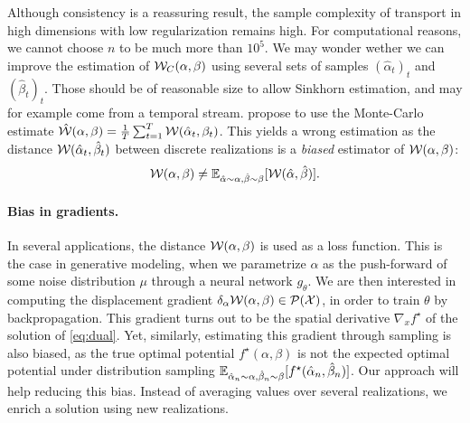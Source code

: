 Although consistency is a reassuring result, the sample complexity of transport
in high dimensions with low regularization remains high. For computational
reasons, we cannot choose $n$ to be much more than $10^5$. We may wonder wether
we can improve the estimation of $\mathcal{W}_{C}(\alpha,\beta)$ using several sets of
samples $(\hat \alpha_t)_t$ and ${(\hat \beta_t)}_t$. Those should be of
reasonable size to allow Sinkhorn estimation, and may for example come from a
temporal stream. \citet{2018-Genevay-aistats} propose to use the Monte-Carlo
estimate $\hat {\mathcal{W}}(\alpha, \beta) = \frac{1}{T} \sum_{t=1}^T \mathcal{W}(\hat \alpha_t,
\beta_t)$. This yields a wrong estimation as the distance $\mathcal{W}(\hat
\alpha_t, \hat \beta_t)$ between discrete realizations is a \textit{biased}
estimator of $\mathcal{W}(\alpha, \beta)$:
\begin{equation}
    \mathcal{W}(\alpha, \beta) \neq 
    \mathbb{E}_{\hat \alpha \sim \alpha, \hat \beta \sim \beta} [\mathcal{W}(\hat \alpha, \hat \beta)].
\end{equation}

\paragraph{Bias in gradients.} In several applications, the distance
$\mathcal{W}(\alpha, \beta)$ is used as a loss function. This is the case in generative
modeling, when we parametrize $\alpha$ as the push-forward of some noise
distribution $\mu$ through a neural network $g_\theta$. We are then interested
in computing the displacement gradient $\delta_\alpha \mathcal{W}(\alpha, \beta) \in
\mathcal{P}(\mathcal{X})$, in order to train $\theta$ by backpropagation. This gradient turns
out to be the spatial derivative $\nabla_x f^\star$ of the solution of
\eqref{eq:dual}. Yet, similarly, estimating this gradient through sampling is
also biased, as the true optimal potential $f^\star(\alpha, \beta)$ is not the
expected optimal potential under distribution sampling $\mathbb{E}_{\hat \alpha_n \sim
\alpha, \hat \beta_n \sim \beta}[f^\star(\hat \alpha_n, \hat \beta_n)]$.  Our
approach will help reducing this bias. Instead of averaging values over several realizations, we enrich a solution using new realizations.